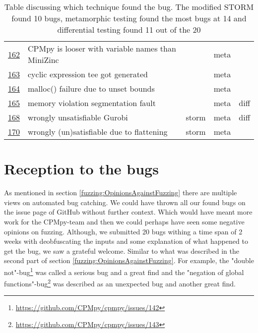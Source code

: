 \begin{table}[]
\begin{tabular}{lllll}
		\href{https://github.com/CPMpy/cpmpy/issues/162}{162} & CPMpy is looser with variable names than MiniZinc &       & meta  &      \\
		\href{https://github.com/CPMpy/cpmpy/issues/163}{163} & cyclic expression tee got generated               &       & meta  &      \\
		\href{https://github.com/CPMpy/cpmpy/issues/164}{164} & malloc() failure due to unset bounds              &       & meta  &      \\
		\href{https://github.com/CPMpy/cpmpy/issues/165}{165} & memory violation segmentation fault               &       & meta  & diff \\
		\href{https://github.com/CPMpy/cpmpy/issues/168}{168} & wrongly unsatisfiable Gurobi                      & storm & meta  & diff \\
		\href{https://github.com/CPMpy/cpmpy/issues/170}{170} & wrongly (un)satisfiable due to flattening         & storm & meta  &      \\ \bottomrule
	\end{tabular}
	\caption{Table discussing which technique found the bug. The modified STORM found 10 bugs, metamorphic testing found the most bugs at 14 and differential testing found 11 out of the 20}
	\label{tab:bug:Technique}
\end{table}


\section{Reception to the bugs} 
As mentioned in section \ref{fuzzing:OpinionsAgainstFuzzing} there are multiple views on automated bug catching. We could have thrown all our found bugs on the issue page of GitHub without further context. Which would have meant more work for the CPMpy-team and then we could perhaps have seen some negative opinions on fuzzing. 
Although, we submitted 20 bugs withing a time span of 2 weeks with deobfuscating the inputs and some explanation of what happened to get the bug, we saw a grateful welcome. Similar to what was described in the second part of section \ref{fuzzing:OpinionsAgainstFuzzing}. 
For example, the "double not"-bug\footnote{\url{https://github.com/CPMpy/cpmpy/issues/142}} was called a serious bug and a great find and 
the "negation of global functions"-bug\footnote{\url{https://github.com/CPMpy/cpmpy/issues/143}} was described as an unexpected bug and another great find.

